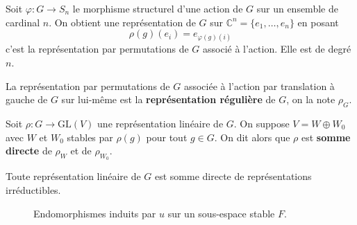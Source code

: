   \begin{example}
    Soit $\varphi : G \rightarrow S_n$ le morphisme structurel d'une action de $G$ sur un ensemble de cardinal $n$. On obtient une représentation de $G$ sur $\mathbb{C}^n = \{ e_1, \dots, e_n \}$ en posant
    \[ \rho(g)(e_i) = e_{\varphi(g)(i)} \]
    c'est la représentation par permutations de $G$ associé à l'action. Elle est de degré $n$.
  \end{example}

  \begin{definition}
    La représentation par permutations de $G$ associée à l'action par translation à gauche de $G$ sur lui-même est la \textbf{représentation régulière} de $G$, on la note $\rho_G$.
  \end{definition}

  \begin{definition}
    Soit $\rho : G \rightarrow \mathrm{GL}(V)$ une représentation linéaire de $G$. On suppose $V = W \oplus W_0$ avec $W$ et $W_0$ stables par $\rho(g)$ pour tout $g \in G$. On dit alors que $\rho$ est \textbf{somme directe} de $\rho_W$ et de $\rho_{W_0}$.
  \end{definition}

  \begin{theorem}
    Toute représentation linéaire de $G$ est somme directe de représentations irréductibles.
  \end{theorem}

  \annexessection


  \begin{figure}[h]
    \begin{center}
    \end{center}
    \caption{Endomorphismes induits par $u$ sur un sous-espace stable $F$.}
  \end{figure}


